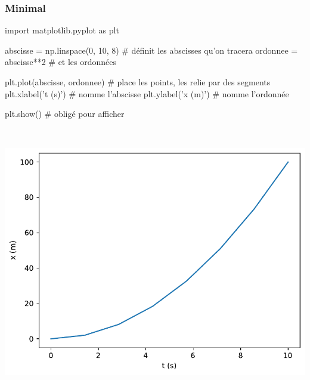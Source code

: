 \documentclass[a4paper, 12pt, garamond]{book}
\begin{document}
\subsubsection{Minimal}
\begin{python}
import matplotlib.pyplot as plt

abscisse = np.linspace(0, 10, 8) # définit les abscisses qu'on tracera
ordonnee = abscisse**2           # et les ordonnées

plt.plot(abscisse, ordonnee)     # place les points, les relie par des segments
plt.xlabel('t (s)')              # nomme l'abscisse
plt.ylabel('x (m)')              # nomme l'ordonnée

plt.show()                       # obligé pour afficher
\end{python}

\begin{minipage}[t]{.48\linewidth}
  ~
  \begin{center}
    \includegraphics[width=\linewidth]{figures/python_plt-1}
    \label{fig:mini}
  \end{center}
\end{minipage}
\hfill
\end{document}
